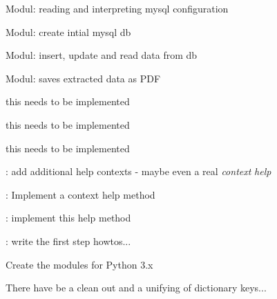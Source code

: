 
\begin{DoxyRefList}
\item[\label{todo__todo000001}%
\hypertarget{todo__todo000001}{}%
File \hyperlink{Backpack_8py}{Backpack.py} ]Modul\-: reading and interpreting mysql configuration 

Modul\-: create intial mysql db 

Modul\-: insert, update and read data from db 

Modul\-: saves extracted data as P\-D\-F  
\item[\label{todo__todo000002}%
\hypertarget{todo__todo000002}{}%
Global \hyperlink{classcalc__ep_1_1MainWindow_a784d15d1157ea5b181c63d73daa3fc5e}{Main\-Window.help\-Handbook} ]this needs to be implemented  
\item[\label{todo__todo000003}%
\hypertarget{todo__todo000003}{}%
Global \hyperlink{classgui_1_1window_1_1MainWindow_a784d15d1157ea5b181c63d73daa3fc5e}{Main\-Window.help\-Handbook} ]this needs to be implemented  
\item[\label{todo__todo000011}%
\hypertarget{todo__todo000011}{}%
Global \hyperlink{classgui_1_1window2_1_1MainWindow_a784d15d1157ea5b181c63d73daa3fc5e}{Main\-Window.help\-Handbook} ]this needs to be implemented  
\item[\label{todo__todo000024}%
\hypertarget{todo__todo000024}{}%
Global \hyperlink{classgui_1_1window3_1_1MenuWin_ab66f1da42371ac6f08a9817adf59a38e}{Menu\-Win.add\-Help} ]\-: add additional help contexts -\/ maybe even a real {\itshape context} {\itshape help}  
\item[\label{todo__todo000026}%
\hypertarget{todo__todo000026}{}%
Global \hyperlink{classgui_1_1window3_1_1MenuWin_a4b810e6adc7d147eaa8edb45dd5891ca}{Menu\-Win.context\-Help} ]\-: Implement a context help method  
\item[\label{todo__todo000025}%
\hypertarget{todo__todo000025}{}%
Global \hyperlink{classgui_1_1window3_1_1MenuWin_a2e91f76cce6e9b7a03830202f45aecf0}{Menu\-Win.first\-Steps} ]\-: implement this help method 

\-: write the first step howtos...  
\item[\label{todo__todo000028}%
\hypertarget{todo__todo000028}{}%
Namespace \hyperlink{namespacetoolbox}{toolbox} ]Create the modules for Python 3.\-x  
\item[\label{todo__todo000030}%
\hypertarget{todo__todo000030}{}%
File \hyperlink{xmlbox_8py}{xmlbox.py} ]There have be a clean out and a unifying of dictionary keys... 
\end{DoxyRefList}